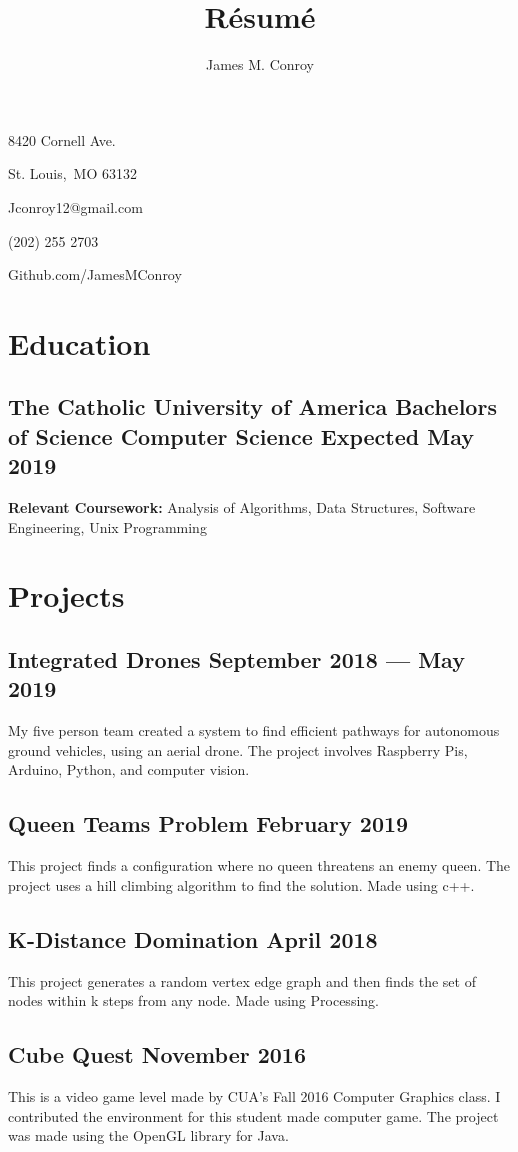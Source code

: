 \documentclass{article}
\author{James M. Conroy}
\title{R\'esum\'e}
\makeatletter
\renewcommand{\maketitle} {
	\begin{center}
	{\huge\bfseries
	\theauthor}

	\end{center}

	8420 Cornell Ave.

	St. Louis,\ MO 63132

	Jconroy12@gmail.com

	(202) 255 2703

	Github.com/JamesMConroy

}
\makeatother
\begin{document}
\maketitle
\section{Education}
\subsection{The Catholic University of America \hfill Bachelors of Science Computer Science \hfill  Expected May 2019 }

\textbf{Relevant Coursework:}
Analysis of Algorithms,
Data Structures,
Software Engineering,
Unix Programming

\section{Projects}
\subsection{Integrated Drones \hfill September 2018 --- May 2019}
\justify
My five person team created a system to find efficient pathways for autonomous ground vehicles, using an aerial drone.
The project involves Raspberry Pis, Arduino, Python, and computer vision.

\subsection{Queen Teams Problem \hfill February 2019}
\justify
This project finds a configuration where no queen threatens an enemy queen.
The project uses a hill climbing algorithm to find the solution.
Made using c++.

\subsection{K-Distance Domination \hfill April 2018}
\justify
This project generates a random vertex edge graph and then finds the set of nodes within k steps from any node.
Made using Processing.

\subsection{Cube Quest \hfill November 2016}
\justify
This is a video game level made by CUA's Fall 2016 Computer Graphics class.
I contributed the environment for this student made computer game.
The project was made using the OpenGL library for Java.
\end{document}
